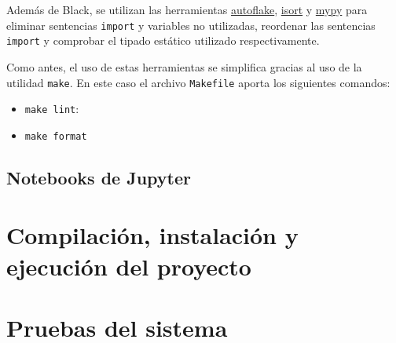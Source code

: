 Además de Black, se utilizan las herramientas
\href{https://github.com/PyCQA/autoflake}{autoflake},
\href{https://github.com/PyCQA/isort}{isort} y
\href{https://github.com/python/mypy}{mypy} para eliminar sentencias
\texttt{import} y variables no utilizadas, reordenar las sentencias
\texttt{import} y comprobar el tipado estático utilizado respectivamente.

Como antes, el uso de estas herramientas se simplifica gracias al uso de la
utilidad \texttt{make}. En este caso el archivo \texttt{Makefile} aporta los siguientes comandos:

\begin{itemize}
    \item \texttt{make lint}:
    \item \texttt{make format}
\end{itemize}

\subsection{Notebooks de Jupyter}



\section{Compilación, instalación y ejecución del proyecto}



\section{Pruebas del sistema}
